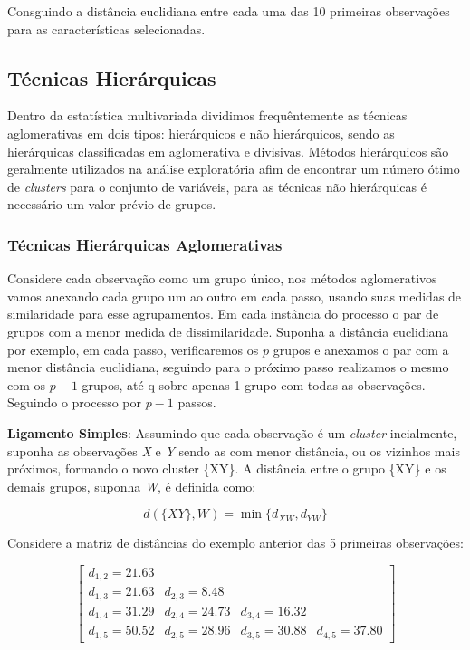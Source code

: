 \documentclass[
  letterpaper,
  DIV=11,
  numbers=noendperiod]{scrreprt}
\begin{document}
Consguindo a distância euclidiana entre cada uma das 10 primeiras
observações para as características selecionadas.

\hypertarget{tuxe9cnicas-hieruxe1rquicas}{%
\subsection{Técnicas Hierárquicas}\label{tuxe9cnicas-hieruxe1rquicas}}

Dentro da estatística multivariada dividimos frequêntemente as técnicas
aglomerativas em dois tipos: hierárquicos e não hierárquicos, sendo as
hierárquicas classificadas em aglomerativa e divisivas. Métodos
hierárquicos são geralmente utilizados na análise exploratória afim de
encontrar um número ótimo de \emph{clusters} para o conjunto de
variáveis, para as técnicas não hierárquicas é necessário um valor
prévio de grupos.

\hypertarget{tuxe9cnicas-hieruxe1rquicas-aglomerativas}{%
\subsubsection{Técnicas Hierárquicas
Aglomerativas}\label{tuxe9cnicas-hieruxe1rquicas-aglomerativas}}

Considere cada observação como um grupo único, nos métodos aglomerativos
vamos anexando cada grupo um ao outro em cada passo, usando suas medidas
de similaridade para esse agrupamentos. Em cada instância do processo o
par de grupos com a menor medida de dissimilaridade. Suponha a distância
euclidiana por exemplo, em cada passo, verificaremos os \(p\) grupos e
anexamos o par com a menor distância euclidiana, seguindo para o próximo
passo realizamos o mesmo com os \(p-1\) grupos, até q sobre apenas 1
grupo com todas as observações. Seguindo o processo por \(p-1\) passos.

\textbf{Ligamento Simples}: Assumindo que cada observação é um
\emph{cluster} incialmente, suponha as observações \emph{X} e \emph{Y}
sendo as com menor distância, ou os vizinhos mais próximos, formando o
novo cluster \{XY\}. A distância entre o grupo \{XY\} e os demais
grupos, suponha \emph{W}, é definida como:

\[
d(\{XY\},W) = \min\{d_{XW},d_{YW}\}
\]

Considere a matriz de distâncias do exemplo anterior das 5 primeiras
observações:

\[
\begin{bmatrix}
d_{1,2}=21.63 &  & & \\
d_{1,3}= 21.63 & d_{2,3}=8.48 & & \\
d_{1,4}=31.29 & d_{2,4}=24.73 & d_{3,4}=16.32 \\
d_{1,5}=50.52 & d_{2,5}=28.96 & d_{3,5}=30.88 & d_{4,5}=37.80
\end{bmatrix}
\]
\end{document}
